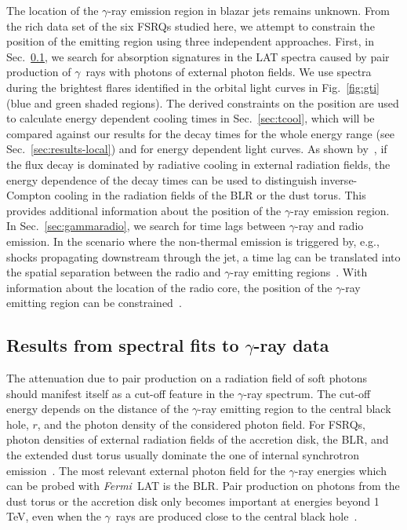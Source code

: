 \documentclass[twocolumn,linenumbers]{aastex62}
\newcommand{\Grays}{$\gamma$~rays\xspace}
\newcommand{\gray}{$\gamma$-ray\xspace}
\newcommand{\FermiLAT}{\emph{Fermi}~LAT\xspace}
\begin{document}
The location of the \gray emission region in blazar jets remains unknown. 
From the rich data set of the six FSRQs studied here, we attempt to constrain the position of the emitting region using three independent approaches. 
First, in Sec.~\ref{sec:blrabs}, we search for absorption signatures in the LAT spectra caused by pair production of \Grays with photons of external photon fields. We use spectra during the brightest flares identified in the orbital light curves in Fig.~\ref{fig:gti} (blue and green shaded regions).
The derived constraints on the position are used to calculate energy dependent cooling times in Sec.~\ref{sec:tcool}, which will be compared against our results for the decay times for the whole energy range (see Sec.~\ref{sec:results-local}) and for energy dependent light curves.
As shown by~\citet{2012ApJ...758L..15D}, if the flux decay is dominated by radiative cooling in external radiation fields, the energy dependence of the decay times can be used to distinguish inverse-Compton cooling in the radiation fields of the BLR or the dust torus.
This provides additional information about the position of the \gray emission region.
In Sec.~\ref{sec:gammaradio}, we search for time lags between \gray and radio emission. 
In the scenario where the non-thermal emission is triggered by, e.g., shocks propagating downstream through the jet, a time lag can be translated into the spatial separation between the radio and \gray emitting regions~\citep{2014MNRAS.445..428M}. 
With information about the location of the radio core, the position of the \gray emitting region can be constrained~\citep[e.g.,][]{2014MNRAS.441.1899F}. 

\subsection{Results from spectral fits to \gray data}
\label{sec:blrabs}
The attenuation due to pair production on a radiation field of soft photons should manifest itself as a cut-off feature in the \gray spectrum. 
The cut-off energy depends on the distance of the \gray emitting region to the central black hole, $r$, and the photon density of the considered photon field.
For FSRQs, photon densities of external radiation fields of the accretion disk, the BLR, and the extended dust torus usually dominate the one of internal synchrotron emission~\citep[see,e.g.,][]{2012ApJ...758L..15D}.
The most relevant external photon field for the \gray energies which can be probed with \FermiLAT is the BLR. 
Pair production on photons from the dust torus or the accretion disk only becomes important at energies beyond 1\,TeV, even when the \Grays are produced close to the central black hole~\citep{finke2016}.
\end{document}
